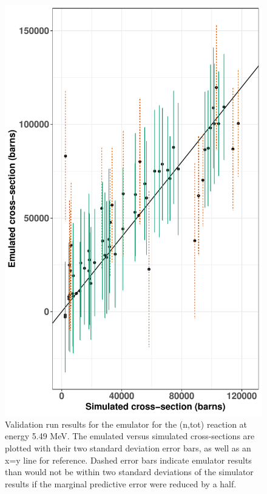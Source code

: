 \documentclass[
  12pt,
  a4paper,
  twoside]{book}
\begin{document}
\begin{figure}[H]

{\centering \includegraphics[width=0.8\linewidth]{figures/good_emulator2} 

}

\caption{Validation run results for the emulator for the (n,tot) reaction at energy 5.49 MeV. The emulated versus simulated cross-sections are plotted with their two standard deviation error bars, as well as an x=y line for reference. Dashed error bars indicate emulator results than would not be within two standard deviations of the simulator results if the marginal predictive error were reduced by a half.}\label{fig:good-emulator}
\end{figure}
\end{document}

